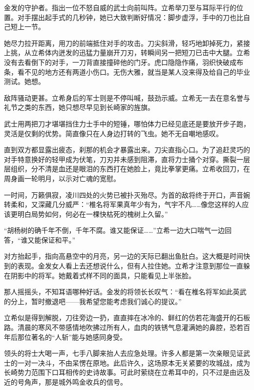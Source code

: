 \documentclass{article}
\begin{document}
金发的守护者。指出一位不怒自威的武士向前叫阵。立希举刀至与耳际平行的位置。对手摆出起手式的几秒钟，她已大致判断好情况：脚步虚浮，手中的刀也比自己短上一节。



她尽力拉开距离，用刀的前端抵住对手的攻击。刀尖斜滑，轻巧地卸掉死力，紧接上挑，从立希体内迸发的迅猛力量崩开刀刃，转瞬间另一把短刀已击中大腿。立希没有去看倒下的对手，一刀背直接撞碎他的门牙。虎口隐隐作痛，羽织快破成布条，看不见的地方还有两道小伤口。无伤大雅，就当是某人没来得及给自己的毕业测试。她想。



敌阵骚动更甚。立希身后的军士则是不停叫喊，鼓劲示威。立希无一去在意名誉与礼节之类的东西，她只想尽早见到长崎家的旌旗。



武士用两把刀才堪堪挡住力士手中的短锤，哪怕体力已经见底还是要放开步子跑，灵活是仅剩的优势。简直像只在人身边打转的飞虫。她不无自嘲地感叹。



直到双方都显露出疲态，刹那的机会才暴露出来。刀尖直指心口。为了追赶灵巧的对手特意换好的轻甲成为伏笔，刀刃并未感到阻滞，直将力士捅个对穿。撕裂一层层组织，分不清是血还是眼泪的东西打在她脸上，竟比拳掌更痛。立希收回刀，在周身画一轮明月，以示对亡魂的宽慰。



一时间，万籁俱寂，凌川四处的火势已被扑灭殆尽。为首的敌将终于开口，声音婉转柔和，又深藏几分威严：“椎名将军果真年少有为，气宇不凡……像您这样的人应该更明白局势如何，何必在一棵快枯死的槐树上久留。”



“胡杨树的确千年不倒，千年不腐。谁又能保证……”立希一边大口喘气一边回答，“谁又能保证和平。”



对方抬起手，指向高悬空中的月亮，另一边的天际已翻出鱼肚白。这大概是时间快到的表现。金发女人看上去还想说什么，但有人拉住她。立希才注意到那位一直躲在阴影中的将军。她戴着式样不同的面具，只能看见上半张脸。



那人摇摇头，不知耳语哪种好话。金发的将领长长叹气：“看在椎名将军如此英武的分上，暂时撤退吧——我希望您能考虑我们诚心的提议。”



立希似是得到解脱，刀往旁边一扔，直直摔在冰冷的、鲜红的仿若花海盛开的石板路。清晨的寒风不带感情地吹拂过所有人，血肉的铁锈气息灌满她的鼻腔，恐若百年后那位著名的“人斩”能与她感同身受。



领头的将士大喝一声，七手八脚来抬人去应急处理。许多人都是第一次亲眼见证武士的一对一决斗，不由呆愣在原地。此后许久，这场原本无关紧要的攻城战，成为长崎势力范围下口耳相传的史诗故事。可此时萦绕在立希耳中的，只不过是由远及近的号角声，那是城外鸣金收兵的信号。
\end{document}
